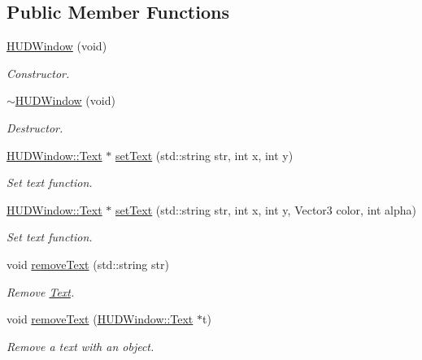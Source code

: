 \subsection*{Public Member Functions}
\begin{DoxyCompactItemize}
\item 
\hyperlink{class_h_u_d_window_a8d97402012deb77be8008cfed176fdd6}{H\+U\+D\+Window} (void)
\begin{DoxyCompactList}\small\item\em Constructor. \end{DoxyCompactList}\item 
\hyperlink{class_h_u_d_window_ac1c288c91430729735038fcefc4bcdb8}{$\sim$\+H\+U\+D\+Window} (void)
\begin{DoxyCompactList}\small\item\em Destructor. \end{DoxyCompactList}\item 
\hyperlink{class_h_u_d_window_1_1_text}{H\+U\+D\+Window\+::\+Text} $\ast$ \hyperlink{class_h_u_d_window_aedb23e2b82cc2b13ee024364deb52d64}{set\+Text} (std\+::string str, int x, int y)
\begin{DoxyCompactList}\small\item\em Set text function. \end{DoxyCompactList}\item 
\hyperlink{class_h_u_d_window_1_1_text}{H\+U\+D\+Window\+::\+Text} $\ast$ \hyperlink{class_h_u_d_window_a9ca581ceb96dd26684978140621ea468}{set\+Text} (std\+::string str, int x, int y, Vector3 color, int alpha)
\begin{DoxyCompactList}\small\item\em Set text function. \end{DoxyCompactList}\item 
void \hyperlink{class_h_u_d_window_a0aedfd1f3c8354da1b69f1b592d4ad3e}{remove\+Text} (std\+::string str)
\begin{DoxyCompactList}\small\item\em Remove \hyperlink{class_h_u_d_window_1_1_text}{Text}. \end{DoxyCompactList}\item 
void \hyperlink{class_h_u_d_window_a1fee364ef03930d6302cc62a2ce8ff56}{remove\+Text} (\hyperlink{class_h_u_d_window_1_1_text}{H\+U\+D\+Window\+::\+Text} $\ast$t)
\begin{DoxyCompactList}\small\item\em Remove a text with an object. \end{DoxyCompactList}\item 

\end{DoxyCompactItemize}

